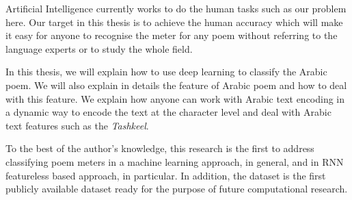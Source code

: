 Artificial Intelligence currently works to do the human tasks such as our problem here. Our target in this thesis is to achieve the human accuracy which will make it easy for anyone to recognise the meter for any poem without referring to the language experts or to study the whole field.

In this thesis, we will explain how to use deep learning to classify the Arabic poem. We will also explain in details the feature of Arabic poem and how to deal with this feature. We explain how anyone can work with Arabic text encoding in a dynamic way to encode the text at the character level and deal with Arabic text features such as the \textit{Tashkeel}.

To the best of the author’s knowledge, this research is the first to address classifying poem meters in a machine learning approach, in general, and in RNN featureless based approach, in particular. In addition, the dataset is the first publicly available dataset ready for the purpose of future computational research.




